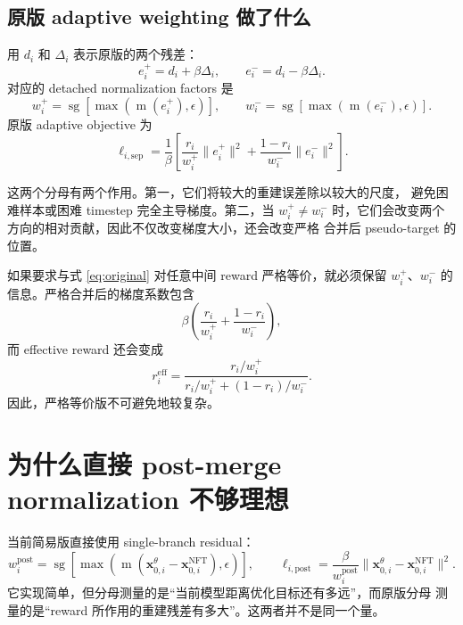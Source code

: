 \documentclass[11pt,a4paper]{article}
\newcommand{\sg}{\operatorname{sg}}
\newcommand{\mabs}{\operatorname{m}}
\newcommand{\xcur}{\mathbf{x}_{0,i}^{\theta}}
\newcommand{\xtarget}{\mathbf{x}_{0,i}^{\mathrm{NFT}}}
\newcommand{\eps}{\epsilon}
\begin{document}
\subsection{原版 adaptive weighting 做了什么}

用 $d_i$ 和 $\Delta_i$ 表示原版的两个残差：
\begin{equation}
e_i^+=d_i+\beta\Delta_i,
\qquad
e_i^-=d_i-\beta\Delta_i.
\end{equation}
对应的 detached normalization factors 是
\begin{equation}
w_i^+
=
\sg\!\left[\max\!\left(\mabs(e_i^+),\eps\right)\right],
\qquad
w_i^-
=
\sg\!\left[\max\!\left(\mabs(e_i^-),\eps\right)\right].
\end{equation}
原版 adaptive objective 为
\begin{equation}
\ell_{i,\mathrm{sep}}
=
\frac{1}{\beta}
\left[
\frac{r_i}{w_i^+}\|e_i^+\|^2
+
\frac{1-r_i}{w_i^-}\|e_i^-\|^2
\right].
\label{eq:original}
\end{equation}

这两个分母有两个作用。第一，它们将较大的重建误差除以较大的尺度，
避免困难样本或困难 timestep 完全主导梯度。第二，当 $w_i^+\neq w_i^-$
时，它们会改变两个方向的相对贡献，因此不仅改变梯度大小，还会改变严格
合并后 pseudo-target 的位置。

如果要求与式 \eqref{eq:original} 对任意中间 reward 严格等价，就必须保留
$w_i^+$、$w_i^-$ 的信息。严格合并后的梯度系数包含
\begin{equation}
\beta
\left(
\frac{r_i}{w_i^+}
+
\frac{1-r_i}{w_i^-}
\right),
\end{equation}
而 effective reward 还会变成
\begin{equation}
r_i^{\mathrm{eff}}
=
\frac{r_i/w_i^+}
{r_i/w_i^+ + (1-r_i)/w_i^-}.
\end{equation}
因此，严格等价版不可避免地较复杂。

\section{为什么直接 post-merge normalization 不够理想}

当前简易版直接使用 single-branch residual：
\begin{equation}
w_i^{\mathrm{post}}
=
\sg\!\left[
\max\!\left(
\mabs(\xcur-\xtarget),
\eps
\right)
\right],
\qquad
\ell_{i,\mathrm{post}}
=
\frac{\beta}{w_i^{\mathrm{post}}}
\|\xcur-\xtarget\|^2.
\label{eq:post}
\end{equation}
它实现简单，但分母测量的是“当前模型距离优化目标还有多远”，而原版分母
测量的是“reward 所作用的重建残差有多大”。这两者并不是同一个量。
\end{document}
